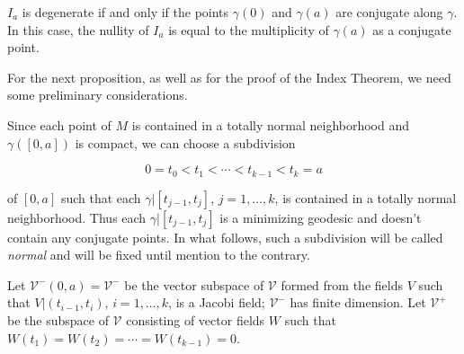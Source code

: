 \begin{corollary}
  \label{cor:dc-ch11-2-4}
  $I_a$ is degenerate if and only if the points $\gamma(0)$ and $\gamma(a)$ are
  conjugate along $\gamma$. In this case, the nullity of $I_a$ is equal to the
  multiplicity of $\gamma(a)$ as a conjugate point.
  
  For the next proposition, as well as for the proof of the Index Theorem, we need
  some preliminary considerations.
  
  Since each point of $M$ is contained in a totally normal neighborhood and
  $\gamma([0,a])$ is compact, we can choose a subdivision
  
  $$
  0=t_0<t_1<\cdots<t_{k-1}<t_k=a
  $$
  
  of $[0,a]$ such that each $\gamma|[t_{j-1},t_j]$, $j=1,\dots,k$, is contained in a
  totally normal neighborhood. Thus each $\gamma|[t_{j-1},t_j]$ is a minimizing
  geodesic and doesn't contain any conjugate points. In what follows, such a
  subdivision will be called \emph{normal} and will be fixed until mention to the
  contrary.
  
  Let $\mathcal{V}^-(0,a)=\mathcal{V}^-$ be the vector subspace of $\mathcal{V}$
  formed from the fields $V$ such that $V|(t_{i-1},t_i)$, $i=1,\dots,k$, is a
  Jacobi field; $\mathcal{V}^-$ has finite dimension. Let $\mathcal{V}^+$ be the
  subspace of $\mathcal{V}$ consisting of vector fields $W$ such that
  $W(t_1)=W(t_2)=\cdots=W(t_{k-1})=0$.
\end{corollary}

